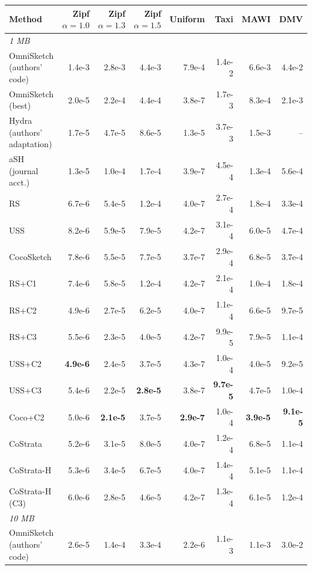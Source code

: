 \begin{tabular}{lrrrrrrr}
\toprule
Method & Zipf $\alpha{=}1.0$ & Zipf $\alpha{=}1.3$ & Zipf $\alpha{=}1.5$ & Uniform & Taxi & MAWI & DMV \\
\midrule
\multicolumn{8}{l}{\emph{1 MB}} \\
OmniSketch {\footnotesize(authors' code)} & 1.4e-3 & 2.8e-3 & 4.4e-3 & 7.9e-4 & 1.4e-2 & 6.6e-3 & 4.4e-2 \\
OmniSketch {\footnotesize(best)} & 2.0e-5 & 2.2e-4 & 4.4e-4 & 3.8e-7 & 1.7e-3 & 8.3e-4 & 2.1e-3 \\
\addlinespace[2pt]
Hydra {\footnotesize(authors' adaptation)} & 1.7e-5 & 4.7e-5 & 8.6e-5 & 1.3e-5 & 3.7e-3 & 1.5e-3 & -- \\
aSH {\footnotesize(journal acct.)} & 1.3e-5 & 1.0e-4 & 1.7e-4 & 3.9e-7 & 4.5e-4 & 1.3e-4 & 5.6e-4 \\
\addlinespace[2pt]
RS & 6.7e-6 & 5.4e-5 & 1.2e-4 & 4.0e-7 & 2.7e-4 & 1.8e-4 & 3.3e-4 \\
USS & 8.2e-6 & 5.9e-5 & 7.9e-5 & 4.2e-7 & 3.1e-4 & 6.0e-5 & 4.7e-4 \\
CocoSketch & 7.8e-6 & 5.5e-5 & 7.7e-5 & 3.7e-7 & 2.9e-4 & 6.8e-5 & 3.7e-4 \\
\addlinespace[2pt]
RS+C1 & 7.4e-6 & 5.8e-5 & 1.2e-4 & 4.2e-7 & 2.1e-4 & 1.0e-4 & 1.8e-4 \\
RS+C2 & 4.9e-6 & 2.7e-5 & 6.2e-5 & 4.0e-7 & 1.1e-4 & 6.6e-5 & 9.7e-5 \\
RS+C3 & 5.5e-6 & 2.3e-5 & 4.0e-5 & 4.2e-7 & 9.9e-5 & 7.9e-5 & 1.1e-4 \\
\addlinespace[2pt]
USS+C2 & \textbf{4.9e-6} & 2.4e-5 & 3.7e-5 & 4.3e-7 & 1.0e-4 & 4.0e-5 & 9.2e-5 \\
USS+C3 & 5.4e-6 & 2.2e-5 & \textbf{2.8e-5} & 3.8e-7 & \textbf{9.7e-5} & 4.7e-5 & 1.0e-4 \\
Coco+C2 & 5.0e-6 & \textbf{2.1e-5} & 3.7e-5 & \textbf{2.9e-7} & 1.0e-4 & \textbf{3.9e-5} & \textbf{9.1e-5} \\
\addlinespace[2pt]
CoStrata & 5.2e-6 & 3.1e-5 & 8.0e-5 & 4.0e-7 & 1.2e-4 & 6.8e-5 & 1.1e-4 \\
CoStrata-H & 5.3e-6 & 3.4e-5 & 6.7e-5 & 4.0e-7 & 1.4e-4 & 5.1e-5 & 1.1e-4 \\
CoStrata-H {\footnotesize(C3)} & 6.0e-6 & 2.8e-5 & 4.6e-5 & 4.2e-7 & 1.3e-4 & 6.1e-5 & 1.2e-4 \\
\midrule
\multicolumn{8}{l}{\emph{10 MB}} \\
OmniSketch {\footnotesize(authors' code)} & 2.6e-5 & 1.4e-4 & 3.3e-4 & 2.2e-6 & 1.1e-3 & 1.1e-3 & 3.0e-2 \\

\end{tabular}
